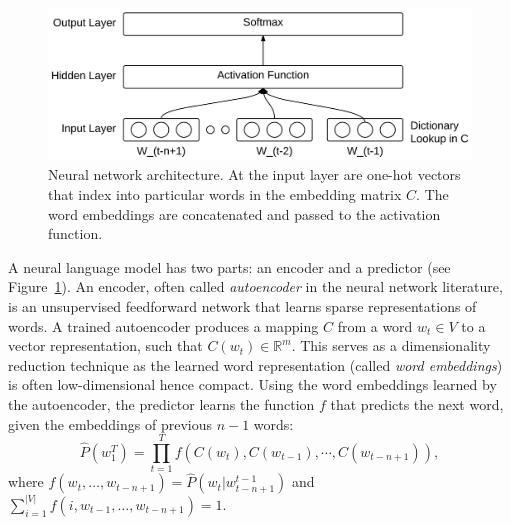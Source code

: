 \documentclass[a4paper,12pt,twoside,openright]{report}
\newcommand{\ti}{\textit}
\begin{document}
\begin{figure}[htbp]
    \centering
    \includegraphics[width=12cm]{figs/nnlm2.png}
    \caption[Neural network architecture.]{Neural network architecture. At the input layer are one-hot vectors that index into particular words in the embedding matrix $C$. The word embeddings are concatenated and passed to the activation function.}
    \label{fig:chap2:nnlm}
\end{figure}

A neural language model has two parts: an encoder and a predictor (see Figure~\ref{fig:chap2:nnlm}). An encoder, often called \ti{autoencoder} in the neural network literature, is an unsupervised feedforward network that learns sparse representations of words. A trained autoencoder produces a mapping $C$ from a word $w_t \in V$ to a vector representation, such that $C(w_t) \in \mathbb{R}^m$. This serves as a dimensionality reduction technique as the learned word representation (called \ti{word embeddings}) is often low-dimensional hence compact. Using the word embeddings learned by the autoencoder, the predictor learns the function $f$ that predicts the next word, given the embeddings of previous $n-1$ words:
$$\hat{P}(w_1^T)=\prod_{t=1}^T{f(C(w_t),C(w_{t-1}),\cdots,C(w_{t-n+1}))},$$
\noindent where $f(w_t, \dots, w_{t-n+1}) = \hat{P}(w_t|w_{t-n+1}^{t-1})$ and $\sum_{i=1}^{|V|}{f(i,w_{t-1},\dots,w_{t-n+1}) = 1.}$
\end{document}
